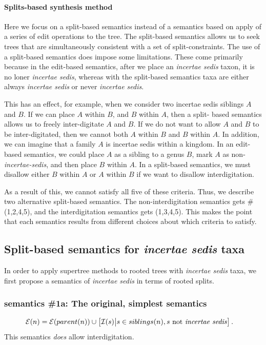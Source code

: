 \documentclass[english]{article}
\begin{document}
\paragraph{Splits-based synthesis method}

Here we focus on a split-based semantics instead of a semantics based on apply
of a series of edit operations to the tree. The split-based semantics allows us
to seek trees that are simultaneously consistent with a set of split-constraints.
The use of a split-based semantics does impose some limitations. These come
primarily because in the edit-based semantics, after we place an
\emph{incertae sedis} taxon, it is no loner \emph{incertae sedis}, whereas with
the split-based semantics taxa are either always \emph{incertae sedis} or never
\emph{incertae sedis}.

This has an effect, for example, when we consider two incertae sedis siblings $A$
and $B$. If we can place $A$ within $B$, and $B$ within $A$, then a split- based
semantics allows us to freely inter-digitate $A$ and $B$. If we do not want to
allow $A$ and $B$ to be inter-digitated, then we cannot both $A$ within $B$ and $B$
within $A$. In addition, we can imagine that a family $A$ is incertae sedis within a
kingdom. In an edit-based semantics, we could place $A$ as a sibling to a genus $B$,
mark $A$ as non-\emph{incertae-sedis}, and then place $B$ within $A$. In a split-based
semantics, we must disallow either $B$ within $A$ or $A$ within $B$ if we want to disallow
interdigitation.

As a result of this, we cannot satisfy all five of these criteria. Thus, we
describe two alternative split-based semantics. The non-interdigitation
semantics gets \# (1,2,4,5), and the interdigitation semantics gets (1,3,4,5).
This makes the point that each semantics results from different choices about
which criteria to satisfy.

\subsection{Split-based semantics for \emph{incertae sedis} taxa}

In order to apply supertree methods to rooted trees with \emph{incertae sedis}
taxa, we first propose a semantics of \emph{incertae sedis }in terms of rooted
splits.

\subsubsection{semantics \#1a: The original, simplest semantics}
\begin{align}
    \mathcal{E}(n) & = \mathcal{E}(parent(n))\cup\left[\mathcal{I}(s)\big|s\in
           siblings(n), s \text{ not \emph{incertae sedis}}\right].\label{eq:exclude-set-formula-1a}
\end{align}
This semantics \emph{does} allow interdigitation.
\end{document}
